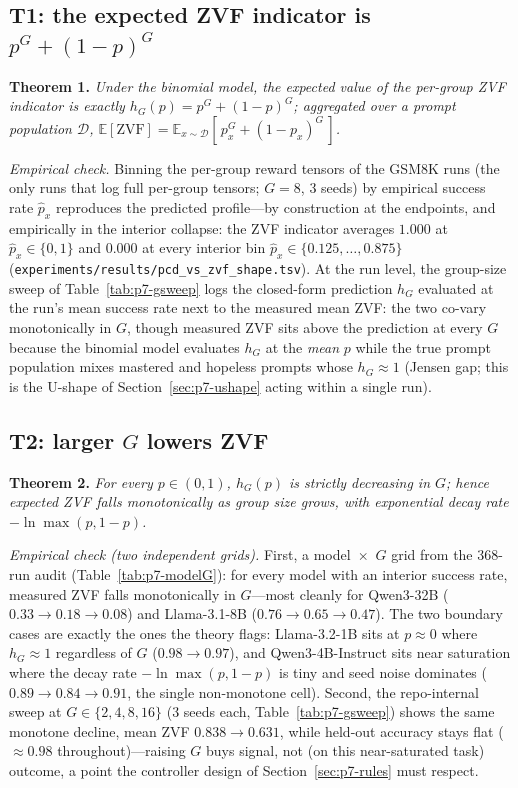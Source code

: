 \documentclass{article}
\newcommand{\E}{\mathbb{E}}
\begin{document}
\subsection{T1: the expected ZVF indicator is $p^G + (1-p)^G$}
\label{sec:p7-t1}
\textbf{Theorem 1.} \emph{Under the binomial model, the expected value of the
per-group ZVF indicator is exactly $h_G(p) = p^G + (1-p)^G$; aggregated over
a prompt population $\mathcal{D}$, $\E[\mathrm{ZVF}] =
\E_{x \sim \mathcal{D}}[\,p_x^G + (1-p_x)^G\,]$.}

\emph{Empirical check.} Binning the per-group reward tensors of the GSM8K
runs (the only runs that log full per-group tensors; $G = 8$, 3 seeds) by
empirical success rate $\hat p_x$ reproduces the predicted profile---by
construction at the endpoints, and empirically in the interior collapse: the
ZVF indicator averages
$1.000$ at $\hat p_x \in \{0, 1\}$ and $0.000$ at every interior bin
$\hat p_x \in \{0.125, \dots, 0.875\}$
(\texttt{experiments/results/pcd_vs_zvf_shape.tsv}). At the run level, the
group-size sweep of Table~\ref{tab:p7-gsweep} logs the closed-form prediction
$h_G$ evaluated at the run's mean success rate next to the measured mean ZVF:
the two co-vary monotonically in $G$, though measured ZVF sits above the
prediction at every $G$ because the binomial model evaluates $h_G$ at the
\emph{mean} $p$ while the true prompt population mixes mastered and hopeless
prompts whose $h_G \approx 1$ (Jensen gap; this is the U-shape of
Section~\ref{sec:p7-ushape} acting within a single run).

\subsection{T2: larger $G$ lowers ZVF}
\label{sec:p7-t2}
\textbf{Theorem 2.} \emph{For every $p \in (0,1)$, $h_G(p)$ is strictly
decreasing in $G$; hence expected ZVF falls monotonically as group size
grows, with exponential decay rate $-\ln\max(p, 1-p)$.}

\emph{Empirical check (two independent grids).} First, a model~$\times$~$G$
grid from the 368-run audit (Table~\ref{tab:p7-modelG}): for every model with
an interior success rate, measured ZVF falls monotonically in $G$---most
cleanly for Qwen3-32B ($0.33 \to 0.18 \to 0.08$) and Llama-3.1-8B
($0.76 \to 0.65 \to 0.47$). The two boundary cases are exactly the ones the
theory flags: Llama-3.2-1B sits at $p \approx 0$ where $h_G \approx 1$
regardless of $G$ ($0.98 \to 0.97$), and Qwen3-4B-Instruct sits near
saturation where the decay rate $-\ln\max(p,1-p)$ is tiny and seed noise
dominates ($0.89 \to 0.84 \to 0.91$, the single non-monotone cell). Second,
the repo-internal sweep at $G \in \{2,4,8,16\}$ (3 seeds each,
Table~\ref{tab:p7-gsweep}) shows the same monotone decline, mean ZVF
$0.838 \to 0.631$, while held-out accuracy stays flat ($\approx 0.98$
throughout)---raising $G$ buys signal, not (on this near-saturated task)
outcome, a point the controller design of Section~\ref{sec:p7-rules} must
respect.
\end{document}
